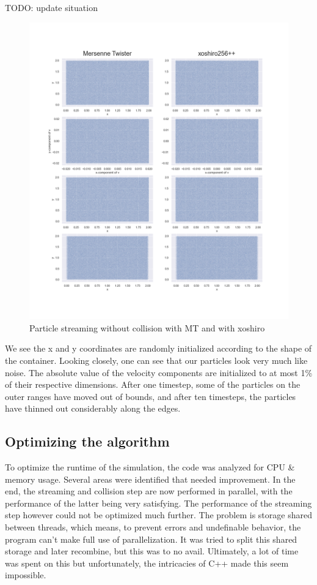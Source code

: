 \documentclass[
]{article}
\begin{document}
TODO: update situation

\begin{figure}
\centering
\includegraphics{Assets/particle_streaming.png}
\caption{Particle streaming without collision with MT and with xoshiro}
\end{figure}

We see the x and y coordinates are randomly initialized according to the
shape of the container. Looking closely, one can see that our particles
look very much like noise. The absolute value of the velocity components
are initialized to at most 1\% of their respective dimensions. After one
timestep, some of the particles on the outer ranges have moved out of
bounds, and after ten timesteps, the particles have thinned out
considerably along the edges.

\hypertarget{optimizing-the-algorithm}{%
\subsection{Optimizing the algorithm}\label{optimizing-the-algorithm}}

To optimize the runtime of the simulation, the code was analyzed for CPU
\& memory usage. Several areas were identified that needed improvement.
In the end, the streaming and collision step are now performed in
parallel, with the performance of the latter being very satisfying. The
performance of the streaming step however could not be optimized much
further. The problem is storage shared between threads, which means, to
prevent errors and undefinable behavior, the program can't make full use
of parallelization. It was tried to split this shared storage and later
recombine, but this was to no avail. Ultimately, a lot of time was spent
on this but unfortunately, the intricacies of C++ made this seem
impossible.
\end{document}
